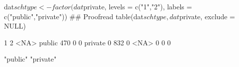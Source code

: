 \begin{Schunk}
\begin{Sinput}
 dat$schtype <- factor(dat$private, levels = c("1","2"), labels = c("public","private"))
 ## Proofread
 table(dat$schtype, dat$private, exclude = NULL)
\end{Sinput}
\begin{Soutput}
            1   2 <NA>
  public  470   0    0
  private   0 832    0
  <NA>      0   0    0
\end{Soutput}
\begin{Soutput}
[1] "public"  "private"
\end{Soutput}
\end{Schunk}
